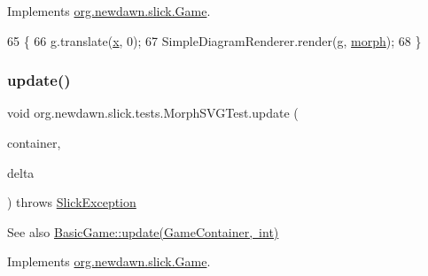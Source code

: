 Implements \mbox{\hyperlink{interfaceorg_1_1newdawn_1_1slick_1_1_game_af1a4670d43eb3ba04dfcf55ab1975b64}{org.\+newdawn.\+slick.\+Game}}.


\begin{DoxyCode}
65                                   \{
66         g.translate(\mbox{\hyperlink{classorg_1_1newdawn_1_1slick_1_1tests_1_1_morph_s_v_g_test_a057720812f0ba829cbcdde70d9a037cf}{x}}, 0);
67         SimpleDiagramRenderer.render(g, \mbox{\hyperlink{classorg_1_1newdawn_1_1slick_1_1tests_1_1_morph_s_v_g_test_a2690459557274439020ce1df8ecd40e6}{morph}});
68     \}
\end{DoxyCode}
\mbox{\label{classorg_1_1newdawn_1_1slick_1_1tests_1_1_morph_s_v_g_test_a0a8a1de7e09f3e8e7129000d1cd336c6}} 
\subsubsection{\texorpdfstring{update()}{update()}}
{\footnotesize\ttfamily void org.\+newdawn.\+slick.\+tests.\+Morph\+S\+V\+G\+Test.\+update (\begin{DoxyParamCaption}\item[{\mbox{\hyperlink{classorg_1_1newdawn_1_1slick_1_1_game_container}{Game\+Container}}}]{container,  }\item[{int}]{delta }\end{DoxyParamCaption}) throws \mbox{\hyperlink{classorg_1_1newdawn_1_1slick_1_1_slick_exception}{Slick\+Exception}}\hspace{0.3cm}{\ttfamily [inline]}}

\begin{DoxySeeAlso}{See also}
\mbox{\hyperlink{classorg_1_1newdawn_1_1slick_1_1_basic_game_acfe6fa05aef83bff1631af91a3e4bd20}{Basic\+Game\+::update(\+Game\+Container, int)}} 
\end{DoxySeeAlso}


Implements \mbox{\hyperlink{interfaceorg_1_1newdawn_1_1slick_1_1_game_ab07b2e9463ee4631620dde0de25bdee8}{org.\+newdawn.\+slick.\+Game}}.


